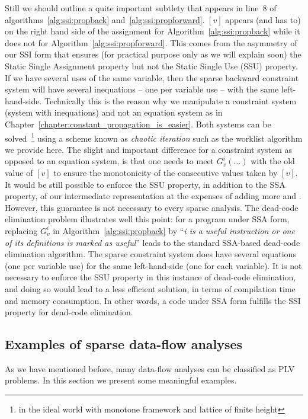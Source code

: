 Still we should outline a quite important subtlety that appears in line~8 of algorithms~\ref{alg:ssi:propback} and~\ref{alg:ssi:propforward}. $[v]$ appears (and has to) on the right hand side of the assignment for Algorithm~\ref{alg:ssi:propback} while it does not for Algorithm~\ref{alg:ssi:propforward}. This comes from the asymmetry of our SSI form that ensures (for practical purpose only as we will explain soon) the Static Single Assignment property but not the Static Single Use (SSU) property.
If we have several uses of the same variable, then the sparse backward constraint system will have several inequations -- one per variable use -- with the same left-hand-side.
Technically this is the reason why we manipulate a constraint system (system with inequations) and not an equation system as in Chapter~\ref{chapter:constant_propagation_is_easier}. Both systems can be solved~\footnote{in the ideal world with monotone framework and lattice of finite height} using a scheme known as \emph{chaotic iteration} such as the worklist algorithm we provide here. The slight and important difference for a constraint system as opposed to an equation system, is that one needs to meet $G_v^i(\dots)$ with the old value of $[v]$ to ensure the monotonicity of the consecutive values taken by $[v]$.
It would be still possible to enforce the SSU property, in addition to the SSA property, of our intermediate representation at the expenses of adding more \phifuns and \sigmafuns.
However, this guarantee is not necessary to every sparse analysis.
The dead-code elimination problem illustrates well this point:
for a program under SSA form, replacing $G_v^i$ in Algorithm~\ref{alg:ssi:propback} by ``\emph{i is a useful instruction or one of its definitions is marked as useful}'' leads to the standard SSA-based dead-code elimination algorithm.
The sparse constraint system does have several equations (one per variable use) for the same left-hand-side (one for each variable).
It is not necessary to enforce the SSU property in this instance of dead-code elimination, and doing so would lead to a less efficient solution, in terms of compilation time and memory consumption.
In other words, a code under SSA form fulfills the SSI property for dead-code elimination.


\subsection{Examples of sparse data-flow analyses}
\label{sub:ssi:examples}

As we have mentioned before, many data-flow analyses can be classified as PLV problems.
In this section we present some meaningful examples.


